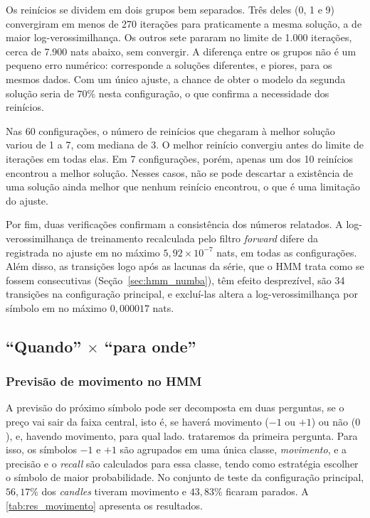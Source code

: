 \documentclass[
    12pt,                %
    openright,           %
    oneside,             %
    a4paper,             %
    english,             %
    brazil               %
]{abntex2}
\begin{document}
Os reinícios se dividem em dois grupos bem separados. Três deles (0, 1 e 9) convergiram em menos de 270 iterações para praticamente a mesma solução, a de 
maior log-verossimilhança. Os outros sete pararam no limite de 1.000 iterações, cerca de 7.900 nats abaixo, sem convergir. A diferença entre os grupos 
não é um pequeno erro numérico: corresponde a soluções diferentes, e piores, para os mesmos dados. Com um único ajuste, a chance de obter o modelo da 
segunda solução seria de $70\%$ nesta configuração, o que confirma a necessidade dos reinícios.

Nas 60 configurações, o número de reinícios que chegaram à melhor solução variou de 1 a 7, com mediana de 3. O melhor reinício convergiu antes do 
limite de iterações em todas elas. Em 7 configurações, porém, apenas um dos 10 reinícios encontrou a melhor solução. Nesses casos, não se pode 
descartar a existência de uma solução ainda melhor que nenhum reinício encontrou, o que é uma limitação do ajuste.

Por fim, duas verificações confirmam a consistência dos números relatados. A log-verossimilhança de treinamento recalculada pelo filtro \textit{forward} difere da 
registrada no ajuste em no máximo $5{,}92 \times 10^{-7}$ nats, em todas as configurações. Além disso, as transições logo após as lacunas da série, 
que o HMM trata como se fossem consecutivas (Seção~\ref{sec:hmm_numba}), têm efeito desprezível, são 34 transições na configuração principal, e excluí-las 
altera a log-verossimilhança por símbolo em no máximo $0{,}000017$ nats.

\subsection{``Quando'' \texorpdfstring{$\times$}{x} ``para onde''}
\label{sec:res_quando_onde}

\subsubsection{Previsão de movimento no HMM}
\label{sec:res_movimento}

A previsão do próximo símbolo pode ser decomposta em duas perguntas, se o preço vai sair da faixa central, isto é, 
se haverá movimento ($-1$ ou $+1$) ou não ($0$), e, havendo movimento, para qual lado. trataremos da primeira pergunta. 
Para isso, os símbolos $-1$ e $+1$ são agrupados em uma única classe, \textit{movimento}, e a precisão e o \textit{recall} \cite{POWERS2020} 
são calculados para essa classe, tendo como estratégia escolher o símbolo de maior probabilidade. No conjunto de teste da configuração principal, 
$56{,}17\%$ dos \textit{candles} tiveram movimento e $43{,}83\%$ ficaram parados. A \autoref{tab:res_movimento} apresenta os resultados.
\end{document}
